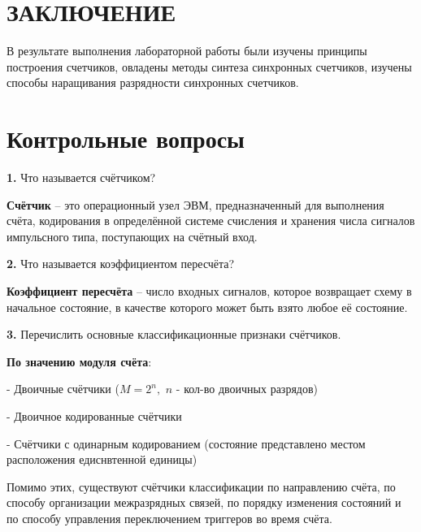 \section*{ЗАКЛЮЧЕНИЕ}

В результате выполнения лабораторной работы были изучены принципы построения счетчиков, овладены методы синтеза синхронных счетчиков, изучены способы наращивания разрядности синхронных счетчиков.

\pagebreak

\section*{Контрольные вопросы}

\noindent\textbf{1.} Что называется счётчиком?\newline

\noindent\textbf{Счётчик} -- это операционный узел ЭВМ, предназначенный для выполнения счёта, кодирования в определённой системе счисления и хранения числа сигналов импульсного типа, поступающих на счётный вход.
\newline

\noindent\textbf{2.} Что называется коэффициентом пересчёта? \newline

\noindent\textbf{Коэффициент пересчёта} -- число входных сигналов, которое возвращает схему в начальное состояние, в качестве которого может быть взято любое её состояние.
\newline

\noindent\textbf{3.} Перечислить основные классификационные признаки счётчиков.\newline

\noindent \textbf{По значению модуля счёта}:\newline

\noindent - Двоичные счётчики ($M = 2^n,$ $n$ - кол-во двоичных разрядов)

\noindent - Двоичное кодированные счётчики

\noindent - Счётчики с одинарным кодированием (состояние представлено местом расположения едиснвтенной единицы)\newline

\noindent Помимо этих, существуют счётчики классификации по направлению счёта, по способу организации межразрядных связей, по порядку изменения состояний и по способу управления переключением триггеров во время счёта.\newline

